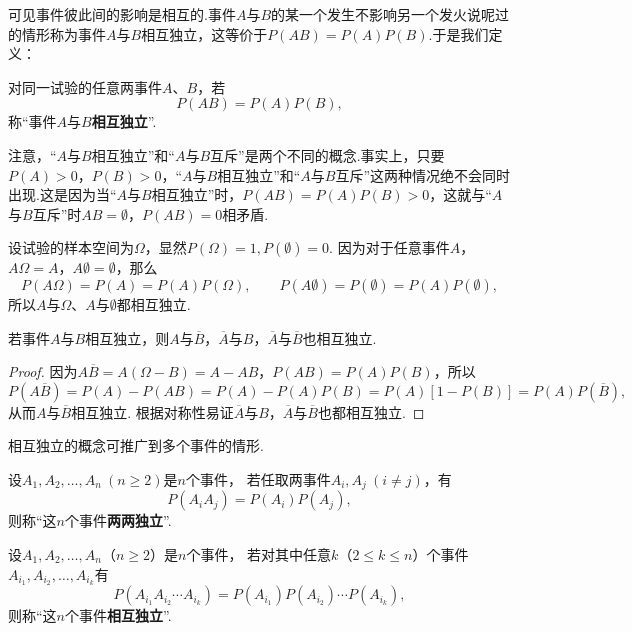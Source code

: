可见事件彼此间的影响是相互的.事件\(A\)与\(B\)的某一个发生不影响另一个发火说呢过的情形称为事件\(A\)与\(B\)相互独立，这等价于\(P(AB) = P(A) P(B)\).于是我们定义：

\begin{definition}
对同一试验的任意两事件\(A\)、\(B\)，若\[
P(AB) = P(A) P(B),
\]称“事件\(A\)与\(B\)\textbf{相互独立}”.
\end{definition}

注意，“\(A\)与\(B\)相互独立”和“\(A\)与\(B\)互斥”是两个不同的概念.事实上，只要\(P(A) > 0\)，\(P(B) > 0\)，“\(A\)与\(B\)相互独立”和“\(A\)与\(B\)互斥”这两种情况绝不会同时出现.这是因为当“\(A\)与\(B\)相互独立”时，\(P(AB) = P(A) P(B) > 0\)，这就与“\(A\)与\(B\)互斥”时\(AB = \emptyset\)，\(P(AB) = 0\)相矛盾.

设试验的样本空间为\(\Omega\)，显然\(P(\Omega) = 1, P(\emptyset) = 0\).
因为对于任意事件\(A\)，\(A \Omega = A\)，\(A \emptyset = \emptyset\)，那么\[
P(A \Omega) = P(A) = P(A) P(\Omega), \qquad
P(A \emptyset) = P(\emptyset) = P(A) P(\emptyset),
\]所以\(A\)与\(\Omega\)、\(A\)与\(\emptyset\)都相互独立.

\begin{theorem}
若事件\(A\)与\(B\)相互独立，则\(A\)与\(\overline{B}\)，\(\overline{A}\)与\(B\)，\(\overline{A}\)与\(\overline{B}\)也相互独立.
\begin{proof}
因为\(A\overline{B}=A(\Omega-B)=A-AB\)，\(P(AB)=P(A)P(B)\)，所以\[
P(A\overline{B})
= P(A) - P(AB)
= P(A) - P(A) P(B)
= P(A) [1 - P(B)]
= P(A) P(\overline{B}),
\]从而\(A\)与\(\overline{B}\)相互独立.
根据对称性易证\(\overline{A}\)与\(B\)，\(\overline{A}\)与\(\overline{B}\)也都相互独立.
\end{proof}
\end{theorem}

相互独立的概念可推广到多个事件的情形.
\begin{definition}
设\(A_1,A_2,\dotsc,A_n\ (n \geqslant 2)\)是\(n\)个事件，%
若任取两事件\(A_i,A_j\ (i \neq j)\)，有\[
P(A_i A_j) = P(A_i) P(A_j),
\]则称“这\(n\)个事件\textbf{两两独立}”.
\end{definition}

\begin{definition}
设\(A_1,A_2,\dotsc,A_n\)（\(n \geqslant 2\)）是\(n\)个事件，%
若对其中任意\(k\)（\(2 \leqslant k \leqslant n\)）个事件\(A_{i_1},A_{i_2},\dotsc,A_{i_k}\)有\[
P(A_{i_1} A_{i_2} \dotsm A_{i_k})
= P(A_{i_1}) P(A_{i_2}) \dotsm P(A_{i_k}),
\]则称“这\(n\)个事件\textbf{相互独立}”.
\end{definition}

